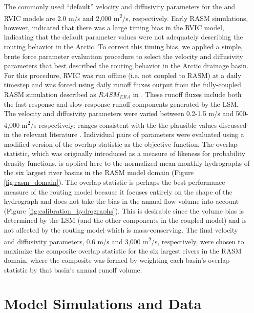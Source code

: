 \documentclass[jgrga, draft]{agutex}
\begin{document}
\begin{article}
The commonly used ``default'' velocity and diffusivity parameters for the \citet{Lohmann_1996} and RVIC models are 2.0 m/s and 2,000 m\textsuperscript{2}/s, respectively.
Early RASM simulations, however, indicated that there was a large timing bias in the RVIC model, indicating that the default parameter values were not adequately describing the routing behavior in the Arctic.
To correct this timing bias, we applied a simple, brute force parameter evaluation procedure to select the velocity and diffusivity parameters that best described the routing behavior in the Arctic drainage basin.
For this procedure, RVIC was run offline (i.e. not coupled to RASM) at a daily timestep and was forced using daily runoff fluxes output from the fully-coupled RASM simulation described as $RASM_{ERA}$ in \citet{Hamman_2016}.
These runoff fluxes include both the fast-response and slow-response runoff components generated by the LSM.
The velocity and diffusivity parameters were varied between 0.2-1.5 m/s and 500-4,000 m\textsuperscript{2}/s respectively; ranges consistent with the the plausible values discussed in the relevant literature \citep[e.g.][]{Decharme_2010,Lohmann_1996}.
Individual pairs of parameters were evaluated using a modified version of the overlap statistic \citep{Perkins_2007} as the objective function.
The overlap statistic, which was originally introduced as a measure of likeness for probability density functions, is applied here to the normalized mean monthly hydrographs of the six largest river basins in the RASM model domain (Figure \ref{fig:rasm_domain}).
The overlap statistic is perhaps the best performance measure of the routing model because it focuses entirely on the shape of the hydrograph and does not take the bias in the annual flow volume into account (Figure \ref{fig:calibration_hydrographs}).
This is desirable since the volume bias is determined by the LSM (and the other components in the coupled model) and is not affected by the routing model which is mass-conserving.
The final velocity and diffusivity parameters, 0.6 m/s and 3,000 m\textsuperscript{2}/s, respectively, were chosen to maximize the composite overlap statistic for the six largest rivers in the RASM domain, where the composite was formed by weighting each basin's overlap statistic by that basin's annual runoff volume.

\section{Model Simulations and Data}
\label{sec:data}


\end{article}
\end{document}
